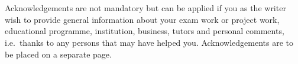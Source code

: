 \section*{}\label{sec:acknowledgements}
{} 
Acknowledgements are not mandatory but can be applied if you as the writer wish to provide general
information about your exam work or project work, educational programme, institution, business,
tutors and personal comments, i.e.\ thanks to any persons that may have helped you. Acknowledgements
are to be placed on a separate page.
